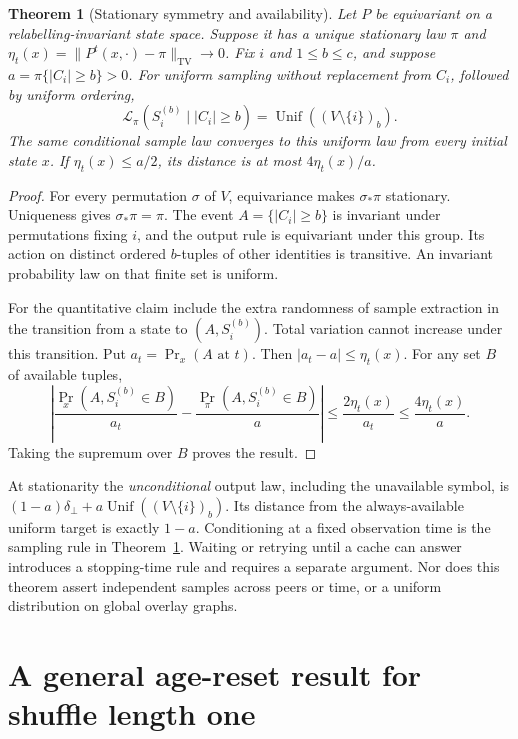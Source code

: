 \documentclass[11pt]{article}
\newtheorem{theorem}{Theorem}
\newcommand{\TV}{\mathrm{TV}}
\newcommand{\Unif}{\operatorname{Unif}}
\newcommand{\Law}{\mathcal L}
\begin{document}
\begin{theorem}[Stationary symmetry and availability]
\label{thm:stationary}
Let $P$ be equivariant on a relabelling-invariant state space.
Suppose it has a unique stationary law $\pi$ and
$\eta_t(x)=\|P^t(x,\cdot)-\pi\|_{\TV}\to0$.
Fix $i$ and $1\le b\le c$, and suppose
$a=\pi\{|C_i|\ge b\}>0$. For uniform sampling without replacement
from $C_i$, followed by uniform ordering,
\[
 \Law_\pi(S_i^{(b)}\mid |C_i|\ge b)
 =\Unif((V\setminus\{i\})_b).
\]
The same conditional sample law converges to this uniform law from
every initial state $x$. If $\eta_t(x)\le a/2$, its distance is at most
$4\eta_t(x)/a$.
\end{theorem}
\begin{proof}
For every permutation $\sigma$ of $V$, equivariance makes
$\sigma_*\pi$ stationary. Uniqueness gives $\sigma_*\pi=\pi$.
The event $A=\{|C_i|\ge b\}$ is invariant under permutations fixing
$i$, and the output rule is equivariant under this group. Its action
on distinct ordered $b$-tuples of other identities is transitive.
An invariant probability law on that finite set is uniform.

For the quantitative claim include the extra randomness of sample
extraction in the transition from a state to $(A,S_i^{(b)})$.
Total variation cannot increase under this transition. Put
$a_t=\Pr_x(A\text{ at }t)$. Then $|a_t-a|\le\eta_t(x)$.
For any set $B$ of available tuples,
\[
 \left|\frac{\Pr_x(A,S_i^{(b)}\in B)}{a_t}
       -\frac{\Pr_\pi(A,S_i^{(b)}\in B)}a\right|
 \le\frac{2\eta_t(x)}{a_t}
 \le\frac{4\eta_t(x)}a .
\]
Taking the supremum over $B$ proves the result.
\end{proof}

At stationarity the \emph{unconditional} output law, including the
unavailable symbol, is
$(1-a)\delta_\bot+a\Unif((V\setminus\{i\})_b)$.
Its distance from the always-available uniform target is exactly
$1-a$. Conditioning at a fixed observation time is the sampling
rule in Theorem~\ref{thm:stationary}. Waiting or retrying until a cache
can answer introduces a stopping-time rule and requires a separate
argument. Nor does this theorem assert independent samples across
peers or time, or a uniform distribution on global overlay graphs.

\section{A general age-reset result for shuffle length one}
\label{sec:agereset}
\end{document}
